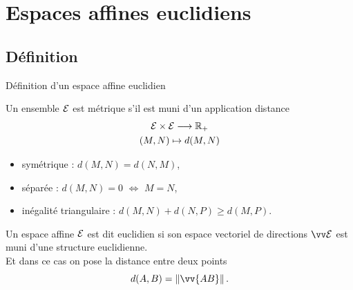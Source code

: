 \documentclass{m53beamer}
\begin{document}
\section{Espaces affines euclidiens}

\subsection{Définition}
\begin{frame}{Définition d'un espace affine euclidien}
  \begin{definition}
    Un ensemble $\mathcal{E}$ est \alert{métrique} s'il est muni d'un application \alert{distance}\forsimple{\vspace*{-.7\baselineskip}}
    \begin{gather*}
      \mathcal{E} \times \mathcal{E} \longrightarrow \mathbb{R}_{+}\\
      (M,N) \mapsto d(M,N)
    \end{gather*}\vspace*{-.7\baselineskip}
    \begin{itemize}[<+(1)->]
      \item symétrique : $d(M,N) = d(N,M)$,
      \item séparée : $d(M,N) = 0$ $\Leftrightarrow$ $M=N$,
      \item inégalité triangulaire : $d(M,N)+d(N,P)\geq d(M,P)$.
    \end{itemize}
  \end{definition}\pause
  \begin{definition}
    Un espace affine $\mathcal{E}$ est dit \alert{euclidien} si son espace vectoriel de directions $\ev{E}$ est muni d'une structure euclidienne.\pause\\
    Et dans ce cas on pose la distance entre deux points
    \[
      d(A,B) = \norm{\vv{AB}}.
    \]
  \end{definition}
\end{frame}

\end{document}
